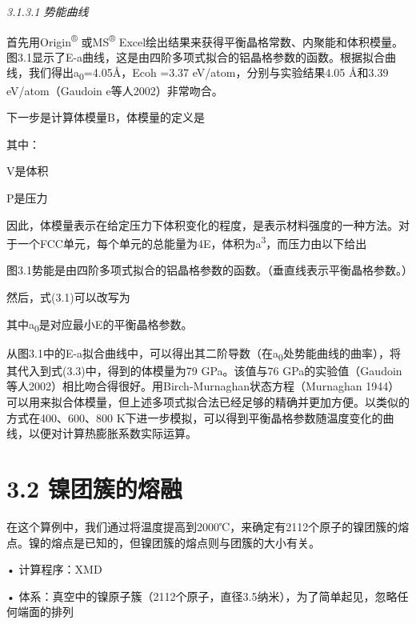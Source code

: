\emph{3.1.3.1 势能曲线}

首先用Origin\textsuperscript{®} 或MS\textsuperscript{®}
Excel绘出结果来获得平衡晶格常数、内聚能和体积模量。图3.1显示了E-a曲线，这是由四阶多项式拟合的铝晶格参数的函数。根据拟合曲线，我们得出a\textsubscript{0}=4.05Å，Ecoh
=3.37 eV/atom，分别与实验结果4.05 Å和3.39 eV/atom（Gaudoin
e等人2002）非常吻合。

下一步是计算体模量B，体模量的定义是


其中：

V是体积

P是压力

因此，体模量表示在给定压力下体积变化的程度，是表示材料强度的一种方法。对于一个FCC单元，每个单元的总能量为4E，体积为a\textsuperscript{3}，而压力由以下给出


图3.1势能是由四阶多项式拟合的铝晶格参数的函数。（垂直线表示平衡晶格参数。）


然后，式(3.1)可以改写为


其中a\textsubscript{0}是对应最小E的平衡晶格参数。

从图3.1中的E-a拟合曲线中，可以得出其二阶导数（在a\textsubscript{0}处势能曲线的曲率），将其代入到式(3.3)中，得到的体模量为79
GPa。该值与76
GPa的实验值（Gaudoin等人2002）相比吻合得很好。用Birch-Murnaghan状态方程（Murnaghan
1944）可以用来拟合体模量，但上述多项式拟合法已经足够的精确并更加方便。以类似的方式在400、600、800
K下进一步模拟，可以得到平衡晶格参数随温度变化的曲线，以便对计算热膨胀系数实际运算。

\hypertarget{ux954dux56e2ux7c07ux7684ux7194ux878d}{%
\section{3.2 镍团簇的熔融}\label{ux954dux56e2ux7c07ux7684ux7194ux878d}}

在这个算例中，我们通过将温度提高到2000℃，来确定有2112个原子的镍团簇的熔点。镍的熔点是已知的，但镍团簇的熔点则与团簇的大小有关。

• 计算程序：XMD

•
体系：真空中的镍原子簇（2112个原子，直径3.5纳米），为了简单起见，忽略任何端面的排列

